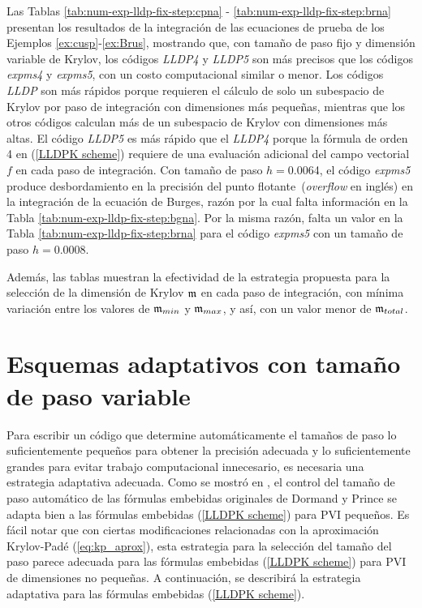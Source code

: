 Las Tablas \ref{tab:num-exp-lldp-fix-step:cpna} - \ref{tab:num-exp-lldp-fix-step:brna} presentan los resultados de la integración de las ecuaciones de prueba de los Ejemplos \ref{ex:cusp}-\ref{ex:Brus}, mostrando que, con tamaño de paso fijo y dimensión variable de Krylov, los códigos \emph{LLDP4} y \emph{LLDP5} son más precisos que los códigos \emph{expms4} y \emph{expms5}, con un costo computacional similar o menor. Los códigos \emph{LLDP} son más rápidos porque requieren el cálculo de solo un subespacio de Krylov por paso de integración con dimensiones más pequeñas, mientras que los otros códigos calculan más de un subespacio de Krylov con dimensiones más altas. El código \emph{LLDP5} es más rápido que el \emph{LLDP4} porque la fórmula de orden 4 en (\ref{LLDPK scheme}) requiere de una evaluación adicional del campo vectorial $f$ en cada paso de integración. Con tamaño de paso $h = 0$.0064, el código \emph{expms5} produce desbordamiento en la precisión del punto flotante~(\textit{overflow} en inglés) en la integración de la ecuación de Burges, razón por la cual falta información en la Tabla \ref{tab:num-exp-lldp-fix-step:bgna}. Por la misma razón, falta un valor en la Tabla \ref{tab:num-exp-lldp-fix-step:brna} para el código \emph{expms5} con un tamaño de paso $h = 0$.0008.

Además, las tablas muestran la efectividad de la estrategia propuesta para la selección de la dimensión de Krylov $\mathfrak{m}$ en cada paso de integración, con mínima variación entre los valores de $\mathfrak{m}_{min}$ y $\mathfrak{m}_{max}$, y así, con un valor menor de $\mathfrak{m}_{total}$.


\section{Esquemas adaptativos con tamaño de paso variable}
Para escribir un código que determine automáticamente el tamaños de paso lo suficientemente pequeños para obtener la precisión adecuada y lo suficientemente grandes para evitar trabajo computacional innecesario, es necesaria una estrategia adaptativa adecuada. Como se mostró en \cite{Jimenez14AMC}, el control del tamaño de paso automático de las fórmulas embebidas originales de Dormand y Prince se adapta bien a las fórmulas embebidas (\ref{LLDPK scheme}) para PVI pequeños. Es fácil notar que con ciertas modificaciones relacionadas con la aproximación Krylov-Padé (\ref{eq:kp_aprox}), esta estrategia para la selección del tamaño del paso parece adecuada para las fórmulas embebidas (\ref{LLDPK scheme}) para PVI de dimensiones no pequeñas. A continuación, se describirá la estrategia adaptativa para las fórmulas embebidas (\ref{LLDPK scheme}).

